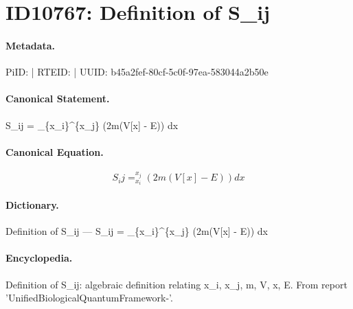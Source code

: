 \section*{ID10767: Definition of S\_ij}
\paragraph{Metadata.}
PiID:  | RTEID:  | UUID: b45a2fef-80cf-5c0f-97ea-583044a2b50e

\paragraph{Canonical Statement.}
S\_ij = \_\{x\_i\}\textasciicircum{}\{x\_j\} (2m(V[x] - E)) dx

\paragraph{Canonical Equation.}
\[
S_ij = _{x_i}^{x_j} (2m(V[x] - E)) dx
\]

\paragraph{Dictionary.}
Definition of S\_ij — S\_ij = \_\{x\_i\}\textasciicircum{}\{x\_j\} (2m(V[x] - E)) dx

\paragraph{Encyclopedia.}
Definition of S\_ij: algebraic definition relating x\_i, x\_j, m, V, x, E. From report 'UnifiedBiologicalQuantumFramework-'.
